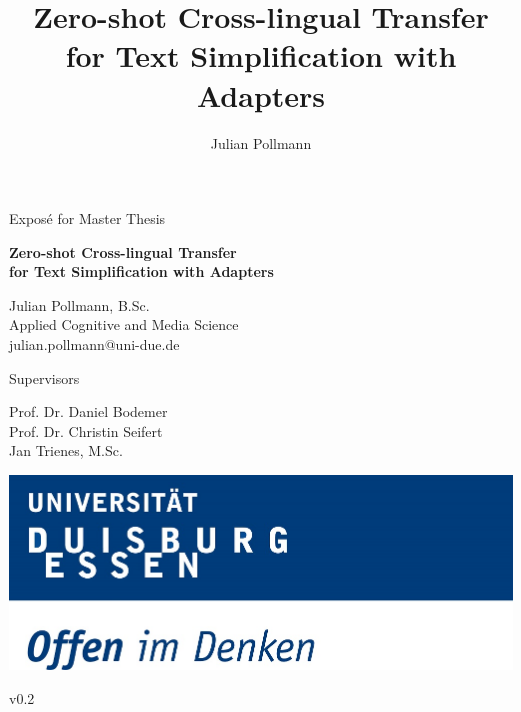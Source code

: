 \documentclass[acmlarge,screen,nonacm]{acmart}
\begin{document}
\title{Zero-shot Cross-lingual Transfer for Text Simplification with Adapters}

\author{Julian Pollmann}

\begin{titlepage}

  \begin{center}
    \Large{Exposé for Master Thesis}
  \end{center}

  \begin{center}
    \vspace{0.03\textheight}
    \begin{huge}
      \textbf{Zero-shot Cross-lingual Transfer\\ for Text Simplification with Adapters}
    \end{huge}

    \vspace{0.03\textheight}
    \Large{Julian Pollmann, B.Sc. \\
    Applied Cognitive and Media Science \\
    julian.pollmann@uni-due.de }

    \vspace{0.5\textheight}
  \end{center}


  \begin{center}

    \Large{Supervisors}

    \Large{Prof. Dr. Daniel Bodemer\\}
    \Large{Prof. Dr. Christin Seifert\\}
    \Large{Jan Trienes, M.Sc.\\}

    \vspace{0.03\textheight}

    \includegraphics[height=15ex]{./figures/ude-logo.jpg}\\

    \vfill

    \normalsize{v0.2}
  \end{center}

\end{titlepage}









\end{document}
